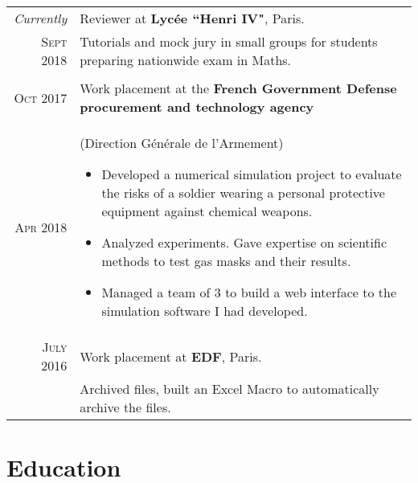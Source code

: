 \documentclass[a4paper,10pt]{article} %
\begin{document}
\begin{tabularx}{\linewidth}{r|X}
  \emph{Currently} & {\large Reviewer at \textbf{Lycée ``Henri IV"}, Paris.}\\
  \textsc{Sept 2018} & \small{Tutorials and mock jury in small groups for students preparing nationwide exam in Maths.}
  \\&\\

\textsc{Oct 2017} & {\large Work placement at the \textbf{French Government Defense procurement and technology agency}}\\
\textsc{Apr 2018} & \small{(Direction Générale de l'Armement)
\begin{itemize}[noitemsep, nolistsep, leftmargin=0.5cm]
  \item Developed a numerical simulation project to evaluate the risks of a soldier wearing a personal protective equipment against chemical weapons.
  \item Analyzed experiments. Gave expertise on scientific methods to test gas masks and their results.
  \item Managed a team of 3 to build a web interface to the simulation software I had developed.
\end{itemize}}\\


\textsc{July 2016} & {\large Work placement at \textbf{EDF}, Paris. }\\
& \small{Archived files, built an Excel Macro to automatically archive the files.}
\end{tabularx}


\section{Education}
\end{document}
